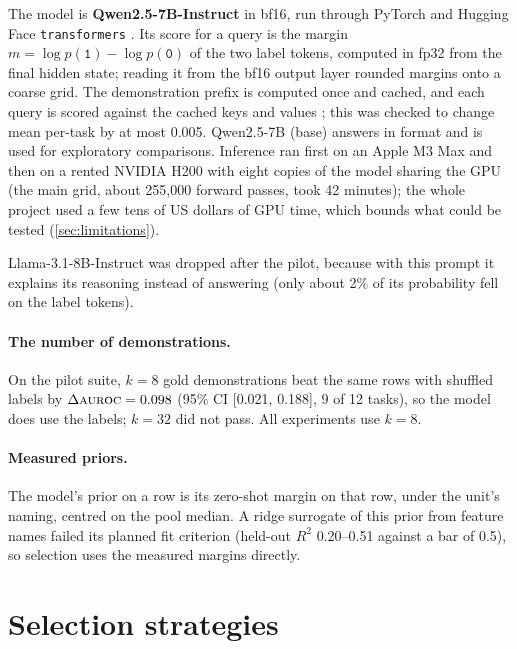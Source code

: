 The model is \textbf{Qwen2.5-7B-Instruct} \citep{qwen2024qwen25} in bf16, run through PyTorch and Hugging Face \texttt{transformers} \citep{paszke2019pytorch,wolf2020transformers}.
Its score for a query is the margin $m = \log p(\texttt{1}) - \log p(\texttt{0})$ of the two label tokens, computed in fp32 from the final hidden state; reading it from the bf16 output layer rounded margins onto a coarse grid.
The demonstration prefix is computed once and cached, and each query is scored against the cached keys and values \citep{pope2023efficiently,gim2024prompt}; this was checked to change mean per-task \AUROC by at most 0.005.
Qwen2.5-7B (base) answers in format and is used for exploratory comparisons. Inference ran first on an Apple M3 Max and then on a rented NVIDIA H200 with eight copies of the model sharing the GPU (the main grid, about 255,000 forward passes, took 42 minutes); the whole project used a few tens of US dollars of GPU time, which bounds what could be tested (\autoref{sec:limitations}).

Llama-3.1-8B-Instruct \citep{grattafiori2024llama3} was dropped after the pilot, because with this prompt it explains its reasoning instead of answering (only about 2\% of its probability fell on the label tokens).

\paragraph{The number of demonstrations.}
On the pilot suite, $k = 8$ gold demonstrations beat the same rows with shuffled labels by $\Delta\textsc{auroc} = 0.098$ (95\% CI [0.021, 0.188], 9 of 12 tasks), so the model does use the labels; $k = 32$ did not pass.
All experiments use $k = 8$.

\paragraph{Measured priors.}
The model's prior on a row is its zero-shot margin on that row, under the unit's naming, centred on the pool median.
A ridge surrogate of this prior from feature names \citep{hoerl1970ridge} failed its planned fit criterion (held-out $R^2$ 0.20--0.51 against a bar of 0.5), so selection uses the measured margins directly.

\section{Selection strategies}
\label{sec:strategies}

